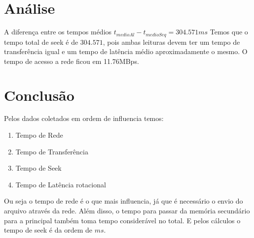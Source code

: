 \documentclass[11pt,a4paper]{article}
\begin{document}
\section{Análise}

A diferença entre os tempos médios $t_{medioAl}-t_{medioSeq}=304.571 ms$
Temos que o tempo total de seek é de $304.571$, pois ambas leituras devem ter um tempo
de transferência igual e um tempo de latência médio aproximadamente o mesmo.
O tempo de acesso a rede ficou em 11.76MBps.

\section{Conclusão}
Pelos dados coletados  em ordem de influencia temos:
\begin{enumerate}
\item Tempo de Rede
\item Tempo de Transferência
\item Tempo de Seek
\item Tempo de Latência rotacional
\end{enumerate}

Ou seja o tempo de rede é o que mais influencia, já que é necessário o envio do arquivo através da rede. Além disso,  o tempo para passar da memória secundário para a principal também toma tempo considerável no total. E pelos cálculos o tempo de seek é da ordem de $ms$.

%
%  
\end{document}
